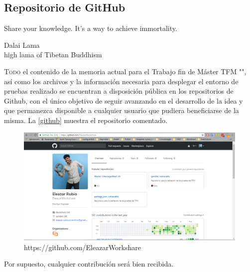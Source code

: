\begin{appendices}
	\chapter{Repositorio de GitHub}\label{ap-01}
	\epigraph{Share your knowledge. It’s a way to achieve immortality.}{Dalai Lama\\high lama of Tibetan Buddhism}
	
	\lettrine[lraise=-0.1, lines=2, loversize=0.2]{T}{odo} el contenido de la memoria actual para el Trabajo fin de Máster \gls{TFM} "\eltitulo", así como los archivos y la información necesaria para desplegar el entorno de pruebas realizado se encuentran a disposición pública en los repositorios de Github, con el único objetivo de seguir avanzando en el desarrollo de la idea y que permanezca disponible a cualquier usuario que pudiera beneficiarse de la misma. La \autoref{github} muestra el repositorio comentado.
	
	\begin{figure}[htbp]
		\centering
		\includegraphics[width=1.0\linewidth]
		{apendices/figuras/github.png}
		\caption{https://github.com/EleazarWorkshare}
		\label{github}
	\end{figure}
	
\end{appendices}

Por supuesto, cualquier contribución será bien recibida.
\endinput